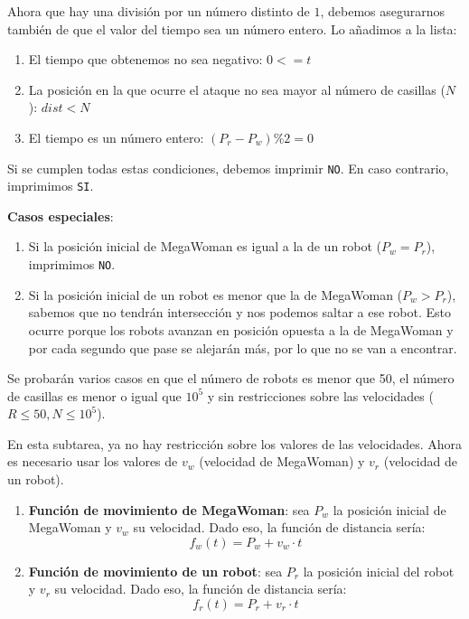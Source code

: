 \documentclass{oci}
\begin{document}
\begin{scoreDescription}
  \newpage

  Ahora que hay una divisi\'on por un n\'umero distinto de $1$, debemos asegurarnos
  tambi\'en de que el valor del tiempo sea un n\'umero entero. Lo a\~nadimos a la lista:
  \begin{enumerate}
    \item El tiempo que obtenemos no sea negativo: $0 <= t$
    \item La posici\'on en la que ocurre el ataque no sea 
    mayor al n\'umero de casillas ($N$): $dist < N $
    \item El tiempo es un n\'umero entero: $ (P_r - P_w) \% 2 = 0$
  \end{enumerate}

  Si se cumplen todas estas condiciones, debemos imprimir \texttt{NO}. 
  En caso contrario, imprimimos \texttt{SI}.

  \textbf{Casos especiales}:
  \begin{enumerate}
    \item Si la posici\'on inicial de MegaWoman es igual a la de un robot ($P_w = P_r$), imprimimos \texttt{NO}.
    \item Si la posici\'on inicial de un robot es menor que la de MegaWoman ($P_w > P_r$), sabemos
    que no tendr\'an intersecci\'on y nos podemos saltar a ese robot. Esto ocurre
    porque los robots avanzan en posici\'on opuesta a la de MegaWoman y por cada segundo
    que pase se alejar\'an m\'as, por lo que no se van a encontrar.
  \end{enumerate}

  \noindent\makebox[\linewidth]{\rule{\paperwidth}{0.2pt}}

   Se probarán varios casos en que el número de robots es menor que
  50, el número de casillas es menor o igual que $10^5$ y sin restricciones sobre las
  velocidades ($R\leq 50, N\leq 10^5$).

  En esta subtarea, ya no hay restricci\'on sobre los valores de las velocidades. 
  Ahora es necesario usar los valores de $v_w$ (velocidad de MegaWoman) y $v_r$ (velocidad
  de un robot).

  \begin{enumerate}
    \item \textbf{Funci\'on de movimiento de MegaWoman}: sea $P_w$ la posici\'on
    inicial de MegaWoman y $v_w$ su velocidad. Dado eso, la funci\'on
    de distancia ser\'ia:
    $$f_w(t) = P_w + v_w \cdot t$$
    \item \textbf{Funci\'on de movimiento de un robot}: sea $P_r$ la posici\'on
    inicial del robot y $v_r$ su velocidad. Dado eso, la funci\'on
    de distancia ser\'ia:
    $$f_r(t) = P_r + v_r \cdot t$$
  \end{enumerate}


\end{scoreDescription}
\end{document}
